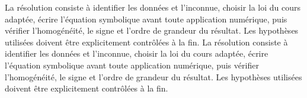 \begin{corrigebox}[Corrigé]
La résolution consiste à identifier les données et l'inconnue, choisir la loi du cours adaptée, écrire l'équation symbolique avant toute application numérique, puis vérifier l'homogénéité, le signe et l'ordre de grandeur du résultat. Les hypothèses utilisées doivent être explicitement contrôlées à la fin.
La résolution consiste à identifier les données et l'inconnue, choisir la loi du cours adaptée, écrire l'équation symbolique avant toute application numérique, puis vérifier l'homogénéité, le signe et l'ordre de grandeur du résultat. Les hypothèses utilisées doivent être explicitement contrôlées à la fin.
\end{corrigebox}
